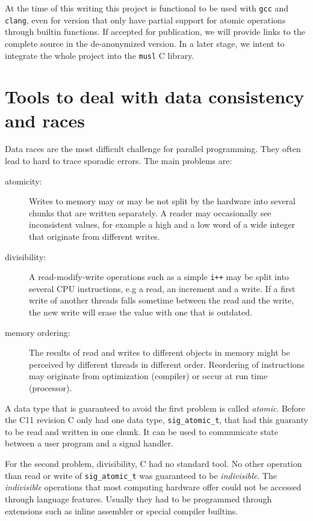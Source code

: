 \documentclass{sig-alternate-05-2015}
\begin{document}
At the time of this writing this project is functional to be used
with \texttt{gcc} and \texttt{clang}, even for version that only have partial
support for atomic operations through builtin functions. If accepted
for publication, we will provide links to the complete source in the
de-anonymized version. In a later stage, we intent to integrate the
whole project into the \texttt{musl} C library.

\section{Tools to deal with data consistency and races}
\label{sec-2}

Data races are the most difficult challenge for parallel
programming. They often lead to hard to trace sporadic errors. The
main problems are:\vspace*{-2ex}

\begin{description}
\item[{atomicity:}] Writes to memory may or may be not split by the
hardware into several chunks that are written
separately. A reader may occasionally see
inconsistent values, for example a high and a low
word of a wide integer that originate from different
writes.\vspace*{-2ex}
\item[{divisibility:}] A read-modify-write operations such as a simple
\texttt{i++} may be split into several CPU instructions,
e.g a read, an increment and a write. If a first
write of another threads falls sometime between
the read and the write, the new write will erase
the value with one that is outdated.\vspace*{-2ex}
\item[{memory ordering:}] The results of read and writes to different
objects in memory might be perceived by different threads in
different order. Reordering of instructions may originate from
optimization (compiler) or occur at run time (processor).
\end{description}

\vspace*{-3ex}
A data type that is guaranteed to avoid the first problem is called
\emph{atomic}. Before the C11 revision C only had one data type,
\texttt{sig\_atomic\_t}, that had this guaranty to be read and written in one
chunk. It can be used to communicate state between a user program
and a signal handler.

For the second problem, divisibility, C had no standard tool. No
other operation than read or write of \texttt{sig\_atomic\_t} was guaranteed
to be \emph{indivisible}.  The \emph{indivisible} operations that most
computing hardware offer could not be accessed through language
features. Usually they had to be programmed through extensions such
as inline assembler or special compiler builtins.
\end{document}
